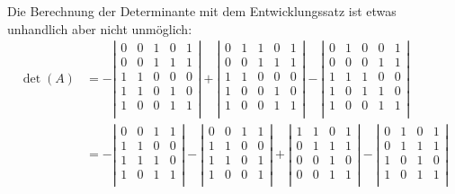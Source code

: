 \begin{loesung}
Die Berechnung der Determinante mit dem Entwicklungssatz ist etwas unhandlich
aber nicht unmöglich:
\begin{align*}
\det(A)&=
-\left|\begin{matrix}
0&0&1&0&1\\
0&0&1&1&1\\
1&1&0&0&0\\
1&1&0&1&0\\
1&0&0&1&1\\
\end{matrix}\right|
+\left|\begin{matrix}
0&1&1&0&1\\
0&0&1&1&1\\
1&1&0&0&0\\
1&0&0&1&0\\
1&0&0&1&1\\
\end{matrix}\right|
-\left|\begin{matrix}
0&1&0&0&1\\
0&0&0&1&1\\
1&1&1&0&0\\
1&0&1&1&0\\
1&0&0&1&1\\
\end{matrix}\right|
\\
&=
-\left|\begin{matrix}
0&0&1&1\\
1&1&0&0\\
1&1&1&0\\
1&0&1&1\\
\end{matrix}\right|
-\left|\begin{matrix}
0&0&1&1\\
1&1&0&0\\
1&1&0&1\\
1&0&0&1\\
\end{matrix}\right|
%
+\left|\begin{matrix}
1&1&0&1\\
0&1&1&1\\
0&0&1&0\\
0&0&1&1\\
\end{matrix}\right|
-\left|\begin{matrix}
0&1&0&1\\
0&1&1&1\\
1&0&1&0\\
1&0&1&1\\
\end{matrix}\right|

\end{align*}
\end{loesung}
